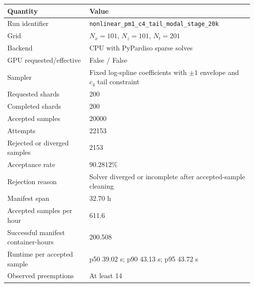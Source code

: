 \begin{tabular}{p{}p{}}
\toprule
Quantity & Value \\
\midrule
Run identifier & \texttt{nonlinear\_pm1\_c4\_tail\_modal\_stage\_20k} \\
Grid & $N_x=101$, $N_z=101$, $N_t=201$ \\
Backend & CPU with PyPardiso sparse solves \\
GPU requested/effective & False / False \\
Sampler & Fixed log-spline coefficients with $\pm 1$ envelope and $c_4$ tail constraint \\
Requested shards & 200 \\
Completed shards & 200 \\
Accepted samples & 20000 \\
Attempts & 22153 \\
Rejected or diverged samples & 2153 \\
Acceptance rate & $90.2812\%$ \\
Rejection reason & Solver diverged or incomplete after accepted-sample cleaning \\
Manifest span & 32.70 h \\
Accepted samples per hour & 611.6 \\
Successful manifest container-hours & 200.508 \\
Runtime per accepted sample & p50 39.02 s; p90 43.13 s; p95 43.72 s \\
Observed preemptions & At least 14 \\
\bottomrule
\end{tabular}
